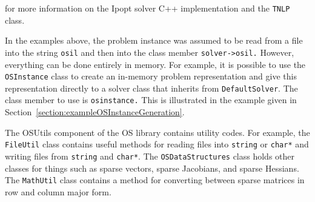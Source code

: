 \medskip
\noindent{\small\tt\UrlIpoptDoc}
\medskip

\noindent for more information on the Ipopt solver C++ implementation and the {\tt TNLP} class.


In the examples above,  the problem instance was assumed to be read from a file into the string {\tt osil}
and then into the class member {\tt solver->osil.} However, everything can be done entirely in memory.
For example, it is possible to use the {\tt OSInstance} class to create
an in-memory problem representation and give this representation directly to a solver class that inherits
from {\tt DefaultSolver}. The class member to use is {\tt osinstance.} This is illustrated in the example
given in Section~\ref{section:exampleOSInstanceGeneration}.



The OSUtils component of the OS library contains utility codes. For example, the {\tt FileUtil} class contains
useful methods for reading files into {\tt string} or {\tt char*} and writing files from {\tt string} and {\tt char*}.
The {\tt OSDataStructures} class holds other classes for things such as sparse vectors, sparse Jacobians, and sparse
Hessians. The {\tt MathUtil} class contains a method for converting between sparse matrices in row and column major form.%

